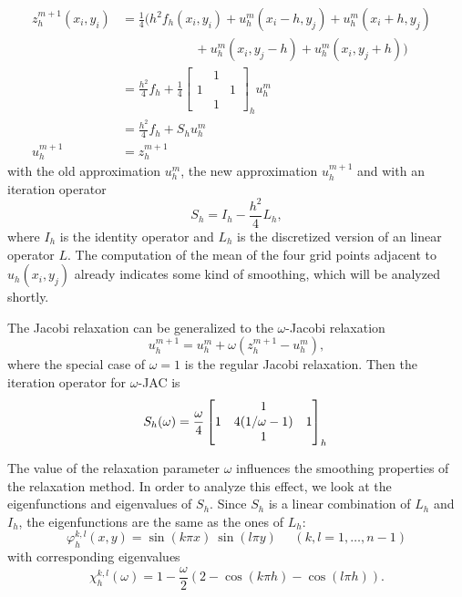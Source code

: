 \begin{align}
z_h^{m+1}(x_i, y_i)&= \frac{1}{4} \Big ( h^2 f_h(x_i, y_i) + u_h^m(x_i-h, y_j) + u_h^m(x_i+h, y_j) \nonumber \\
                  &~~~~~~~~~~~~~~~~~~~~~~~~~~+ u_h^m(x_i, y_j-h) + u_h^m(x_i,y_j+h) \Big ) \\
                  &= \frac{h^2}{4} f_h + \frac{1}{4} \begin{bmatrix}
                  &1 \\
                  1 & & 1\\
                  & 1& 
                  \end{bmatrix}_h u_h^m \nonumber \\
                  & = \frac{h^2}{4} f_h + S_h u_h^m \nonumber \\
        u_h^{m+1} &= z_h^{m+1} & \nonumber
\end{align}
 with the old approximation $u_h^{m}$, the new approximation $u_h^{m+1}$ and with an iteration operator 
 \begin{equation}
 S_h = I_h - \frac{h^2}{4} L_h,
 \end{equation}
 where $I_h$ is the identity operator and $L_h$ is the discretized version of an linear operator $L$. The computation of the mean of the four grid points adjacent to $u_h(x_i, y_j)$ already indicates some kind of smoothing, which will be analyzed shortly. 
 
The Jacobi relaxation can be generalized to the $\omega$-Jacobi relaxation
\begin{equation}
u_h^{m+1} = u_h^m + \omega (z_h^{m+1}-u_h^m),
\end{equation}
where the special case of $\omega = 1$ is the regular Jacobi relaxation. Then the iteration operator for $\omega$-JAC is 
\begin{equation}
S_h(\omega) = \frac{\omega}{4} \begin{bmatrix}
                  &1 \\
                  1 & 4(1/\omega -1) & 1\\
                  & 1& 
                  \end{bmatrix}_h\\
\end{equation}

The value of the relaxation parameter $\omega$ influences the smoothing properties of the relaxation method. In order to analyze this effect, we look at the eigenfunctions and eigenvalues of $S_h$. Since $S_h$ is a linear combination of $L_h$ and $I_h$, the eigenfunctions are the same as the ones of $L_h$:
\begin{equation}
\varphi_h ^{k,l}(x,y) = \sin (k \pi x)~ \sin (l \pi y) \text{~~~~}(k,l = 1, \hdots, n-1)
\end{equation}
with corresponding eigenvalues 
\begin{equation}
\chi_h^{k,l}(\omega) = 1- \frac{\omega}{2}(2-\cos (k \pi h) - \cos (l \pi h)).
\label{equ:eigenvalues}
\end{equation}

